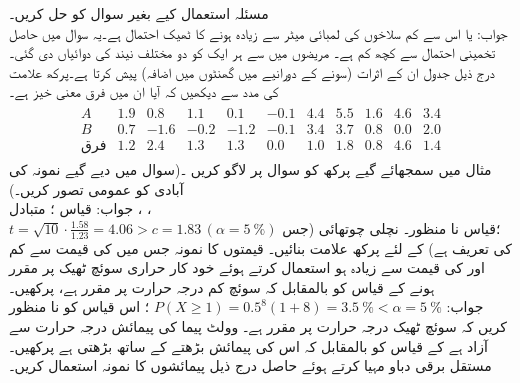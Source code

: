 \quad
مسئلہ  استعمال کیے بغیر سوال   کو حل کریں۔\\
جواب:\quad
{} یا اس سے کم  سلاخوں کی لمبائی  میٹر سے زیادہ ہونے کا ٹھیک  احتمال  ہے۔یہ سوال  میں حاصل تخمینی احتمال سے کچھ کم ہے۔
\quad
{} مریضوں میں سے ہر ایک کو دو مختلف نیند کی دوائیاں دی گئی۔درج ذیل جدول ان کے اثرات (سونے کے دورانیے میں گھنٹوں میں اضافہ) پیش کرتا ہے۔پرکھ علامت کی مدد سے دیکھیں کہ آیا ان میں فرق معنی خیز ہے۔\\
\begin{align*}
\begin{array}{c|rrrrrrrrrr}
A&1.9&0.8&1.1&0.1&-0.1&4.4&5.5&1.6&4.6&3.4\\
B&0.7&-1.6&-0.2&-1.2&-0.1&3.4&3.7&0.8&0.0&2.0\\
\hline
\text{فرق} &1.2&2.4&1.3&1.3&0.0&1.0&1.8&0.8&4.6&1.4
\end{array}
\end{align*}
\quad
مثال  میں سمجھائے گیے پرکھ کو  سوال  پر لاگو کریں ۔(سوال میں دیے گیے  نمونہ کی آبادی کو عمومی تصور کریں۔)  \\
جواب:\quad
قیاس ؛ متبادل ، ،\\
 $t=\sqrt{10}\cdot \tfrac{1.58}{1.23}=4.06>c=1.83\,(\alpha=\SI{5}{\percent})$
؛قیاس نا منظور۔
\quad
نچلی چوتھائی  (جس کی تعریف  ہے) کے لئے پرکھ علامت بنائیں۔ 
\quad
{} قیمتوں کا نمونہ جس میں  کی قیمت  سے کم اور  کی قیمت  سے زیادہ ہو استعمال کرتے ہوئے  خود کار حراری سوئچ ٹھیک  پر مقرر ہونے کے قیاس کو  بالمقابل کہ سوئچ کم درجہ حرارت پر مقرر ہے، پرکھیں۔\\
جواب:\quad
$P(X\ge1)=0.5^8(1+8)=\SI{3.5}{\percent}<\alpha=\SI{5}{\percent}$
؛ اس قیاس کو نا منظور کریں کہ سوئچ ٹھیک درجہ حرارت پر مقرر ہے۔
\quad
وولٹ پیما کی پیمائش درجہ حرارت  سے آزاد ہے کے قیاس کو بالمقابل کہ اس کی پیمائش بڑھتے  کے ساتھ بڑھتی ہے پرکھیں۔مستقل برقی دباو مہیا کرتے ہوئے حاصل درج ذیل پیمائشوں کا نمونہ استعمال کریں۔
